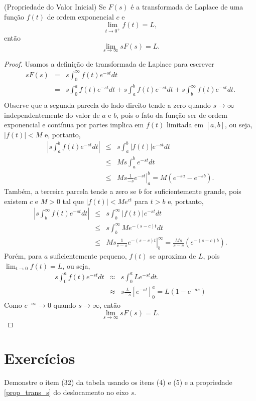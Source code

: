 \begin{propr}(Propriedade do Valor Inicial) Se $F(s)$ é a transformada de Laplace de uma função $f(t)$ de ordem exponencial $c$ e 
$$
\lim_{t\to 0^+}f(t)=L,
$$
então
$$
\lim_{s\to \infty} sF(s)=L.
$$
\end{propr}
\begin{proof}Usamos a definição de transformada de Laplace para escrever
\begin{eqnarray*}
sF(s)&=&s\int_0^\infty f(t)e^{-st}dt\\
&=&s\int_0^a f(t)e^{-st}dt+s\int_a^b f(t)e^{-st}dt+s\int_b^\infty f(t)e^{-st}dt.\\
\end{eqnarray*}
Observe que a segunda parcela do lado direito tende a zero quando $s\to \infty$ independentemente do valor de $a$ e $b$, pois o fato da função ser de ordem exponencial e contínua por partes implica em $f(t)$ limitada em $[a,b]$, ou seja, $|f(t)|<M$ e, portanto,
\begin{eqnarray*}
\left|s\int_a^b f(t)e^{-st}dt\right|&\leq & s\int_a^b |f(t)|e^{-st}dt\\
&\leq & Ms\int_a^b e^{-st}dt\\
&\leq & \left.Ms\frac{1}{-s} e^{-st}\right|_a^b=M(e^{-sa}-e^{-sb}).
\end{eqnarray*}
Também, a terceira parcela tende a zero se $b$ for suficientemente grande, pois existem $c$ e $M>0$ tal que $|f(t)|<Me^{ct}$ para $t>b$ e, portanto,
\begin{eqnarray*}
\left|s\int_b^\infty f(t)e^{-st}dt\right|&\leq & s\int_b^\infty |f(t)|e^{-st}dt\\
&\leq & s\int_b^\infty Me^{-(s-c)t}dt\\
&\leq & \left.Ms\frac{1}{c-s} e^{-(s-c)t}\right|_b^\infty=\frac{Ms}{s-c}(e^{-(s-c)b}).
\end{eqnarray*}
Porém, para $a$ suficientemente pequeno, $f(t)$ se aproxima de $L$, pois $\displaystyle \lim_{t\to 0}f(t)=L$, ou seja,
\begin{eqnarray*}
s\int_0^a f(t)e^{-st}dt &\approx &s\int_0^a L e^{-st}dt.\\
&\approx &s\frac{L}{-s}\left[ e^{-st}\right]_0^a=L\left(1-e^{-as}\right)
\end{eqnarray*}
Como $e^{-as}\to 0$ quando $s\to \infty$, então
$$
\lim_{s\to \infty} sF(s)=L.
$$ 
\end{proof}

\section{Exercícios}
\begin{Exercise}
 Demonstre o item (32) da tabela usando os itens (4) e (5) e a propriedade \ref{prop_trans_s} do deslocamento no eixo $s$. 
\end{Exercise}

